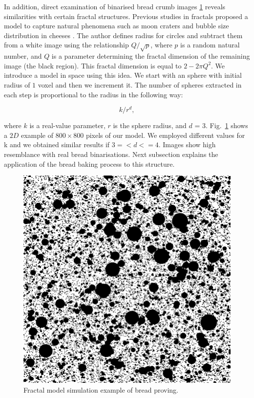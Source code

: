 \documentclass[final,5p,times]{elsarticle}
\begin{document}
In addition, direct examination of binarised bread crumb images \ref{Fig2} reveals similarities with certain fractal structures. Previous studies in fractals proposed a model to capture natural phenomena such as moon craters and bubble size distribution in cheeses \cite{Mandelbrot1982}. The author defines radius for circles and subtract them from a white image using the relationship $Q/\sqrt{p}$, where $p$ is a random natural number, and $Q$ is a parameter determining the fractal dimension of the remaining image (the black region). This fractal dimension is equal to $2-2\pi Q^{2}$. We introduce a model in space using this idea. We start with an sphere with initial radius of $1$ voxel and then we increment it. The number of spheres extracted in each step is proportional to the radius in the following way:

\begin{equation}
k/r^{d},
\end{equation}

\noindent where $k$ is a real-value parameter, $r$ is the sphere radius, and $d$ = 3.
Fig.~\ref{Fig2} shows a $2D$ example of $800\times800$ pixels of our model. We employed different values for k and we obtained similar results if $3=<d<=4$. Images show high resemblance with real bread binarisations. Next subsection explains the application of the bread baking process to this structure.


\begin{figure}
\includegraphics[scale=0.3]{bubbles.png}
\caption{Fractal model simulation example of bread proving.}
\label{Fig2}
\end{figure}
\end{document}
